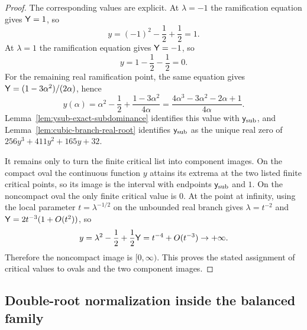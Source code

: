 \begin{proof}
The corresponding values are explicit.
At $\lambda=-1$ the ramification equation gives $\mathsf{Y}=1$, so
\[
y=(-1)^2-\frac12+\frac12=1.
\]
At $\lambda=1$ the ramification equation gives $\mathsf{Y}=-1$, so
\[
y=1-\frac12-\frac12=0.
\]
For the remaining real ramification point, the same equation gives
\(\mathsf{Y}=(1-3\alpha^2)/(2\alpha)\), hence
\[
y(\alpha)=\alpha^2-\frac12+\frac{1-3\alpha^2}{4\alpha}
=\frac{4\alpha^3-3\alpha^2-2\alpha+1}{4\alpha}.
\]
Lemma~\ref{lem:ysub-exact-subdominance} identifies this value with \(\mathsf{y}_{\mathrm{sub}}\), and Lemma~\ref{lem:cubic-branch-real-root} identifies \(\mathsf{y}_{\mathrm{sub}}\) as the unique real zero of $256y^3+411y^2+165y+32$.

It remains only to turn the finite critical list into component images.
On the compact oval the continuous function $y$ attains its extrema at the two listed finite critical points, so its image is the interval with endpoints $\mathsf{y}_{\mathrm{sub}}$ and $1$.
On the noncompact oval the only finite critical value is $0$.
At the point at infinity, using the local parameter $t=\lambda^{-1/2}$ on the unbounded real branch gives $\lambda=t^{-2}$ and $\mathsf{Y}=2t^{-3}(1+O(t^2))$, so
\[
y=\lambda^2-\frac12+\frac12\mathsf{Y}=t^{-4}+O(t^{-3})\to+\infty.
\]
Therefore the noncompact image is $[0,\infty)$.
This proves the stated assignment of critical values to ovals and the two component images.\label{rem:balanced-family-generality}
\end{proof}

\subsection{Double-root normalization inside the balanced family}

